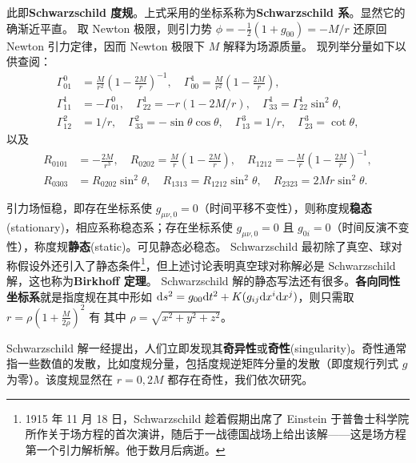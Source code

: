 此即\textbf{Schwarzschild 度规}。上式采用的坐标系称为\textbf{Schwarzschild 系}。显然它的确渐近平直。
取 Newton 极限，则引力势 $\phi=-\frac 12(1+g_{00})=-M/r$ 还原回 Newton 引力定律，因而 Newton 极限下 $M$ 解释为场源质量。
现列举分量如下以供查阅：
\begin{align*}
    \Gamma_{01}^0&=\frac{M}{r^2}\left(1-\frac{2M}{r}\right)^{-1}, \quad \Gamma_{00}^1=\frac{M}{r^2}\left(1-\frac{2M}{r}\right), \\
    \Gamma_{11}^1&=-\Gamma_{01}^0,\quad\Gamma_{22}^1=-r(1-{2M}/{r}),\quad\Gamma_{33}^1=\Gamma_{22}^1\sin ^2 \theta, \\
    \Gamma_{12}^2&=1 / r,\quad\Gamma_{33}^2=-\sin \theta \cos \theta,\quad\Gamma_{13}^3=1 / r,\quad\Gamma_{23}^3=\cot \theta,
\end{align*}
以及
\begin{align*}
    R_{0101}&=-\frac{2 M}{r^3}, \quad R_{0202}=\frac{M}{r}\left(1-\frac{2M}{r}\right), \quad R_{1212}=-\frac{M}{r}\left(1-\frac{2M}{r}\right)^{-1}, \\
    R_{0303}&=R_{0202} \sin ^2 \theta, \quad R_{1313}=R_{1212} \sin ^2 \theta, \quad R_{2323}=2 M r \sin ^2 \theta.
\end{align*}

引力场恒稳，即存在坐标系使 $g_{\mu\nu,0}=0$（时间平移不变性），则称度规\textbf{稳态}(stationary)，相应系称稳态系；存在坐标系使 $g_{\mu\nu,0}=0$ 且 $g_{0i}=0$（时间反演不变性），称度规\textbf{静态}(static)。可见静态必稳态。
Schwarzschild 最初除了真空、球对称假设外还引入了静态条件\footnote{1915 年 11 月 18 日，Schwarzschild 趁着假期出席了 Einstein 于普鲁士科学院所作关于场方程的首次演讲，随后于一战德国战场上给出该解——这是场方程第一个引力解析解。他于数月后病逝。}，但上述讨论表明真空球对称解必是 Schwarzschild 解，这也称为\textbf{Birkhoff 定理}。
Schwarzschild 解的静态写法还有很多。\textbf{各向同性坐标系}就是指度规在其中形如 $\dd s^2=g_{00}\dd t^2+K(g_{ij}\dd x^i\dd x^j)$，则只需取 $r=\rho(1+\frac{M}{2\rho})^2$ 有
其中 $\rho=\sqrt{x^2+y^2+z^2}$。

Schwarzschild 解一经提出，人们立即发现其\textbf{奇异性}或\textbf{奇性}(singularity)。奇性通常指一些数值的发散，比如度规分量，包括度规逆矩阵分量的发散（即度规行列式 $g$ 为零）。该度规显然在 $r=0,2M$ 都存在奇性，我们依次研究。

